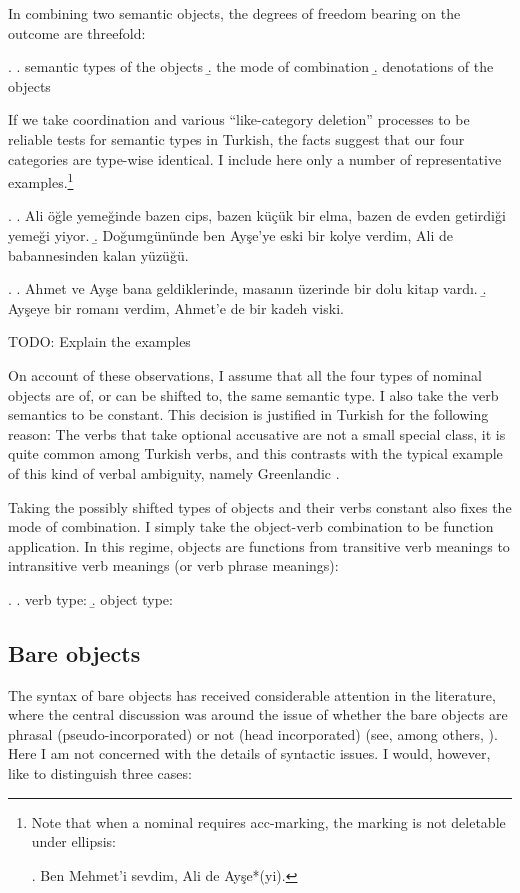 \documentclass[11pt,a4paper]{article}
\begin{document}
In combining two semantic objects, the degrees of freedom bearing on the outcome are threefold:

\ex.
\a. semantic types of the objects
\b. the mode of combination
\b. denotations of the objects

If we take coordination and various ``like-category deletion'' processes to be reliable tests for semantic types in Turkish, the facts suggest that our four categories are type-wise identical. I include here only a number of representative examples.\footnote{Note that when a nominal requires acc-marking, the marking is not deletable under ellipsis:

\ex. Ben Mehmet'i sevdim, Ali de Ayşe*(yi).

}

\ex.
\a. Ali öğle yemeğinde bazen cips, bazen küçük bir elma, bazen de evden getirdiği yemeği yiyor. 
\b. Doğumgününde ben Ayşe'ye eski bir kolye verdim, Ali de babannesinden kalan yüzüğü. 

\ex.
\a. Ahmet ve Ayşe bana geldiklerinde, masanın üzerinde bir dolu kitap vardı.
\b.\label{typeell} Ayşeye bir romanı verdim, Ahmet'e de bir kadeh viski.

TODO: Explain the examples

On account of these observations, I assume that all the four types of nominal objects are of, or can be shifted to, the same semantic type. I also take the verb semantics to be constant. This decision is justified in Turkish for the following reason: The verbs that take optional accusative are not a small special class, it is quite common among Turkish verbs, and this contrasts with the typical example of this kind of verbal ambiguity, namely Greenlandic .

Taking the possibly shifted types of objects and their verbs constant also fixes the mode of combination. I simply take the object-verb combination to be function application. In this regime, objects are functions from transitive verb meanings to intransitive verb meanings (or verb phrase meanings):

\ex.
\a. verb type:  
\b. object type:  

\subsection{Bare objects}

The syntax of bare objects has received considerable attention in the literature, where the central discussion was around the issue of whether the bare objects are phrasal (pseudo-incorporated) or not (head incorporated) (see, among others, ). Here I am not concerned with the details of syntactic issues. I would, however, like to distinguish three cases:
\end{document}
